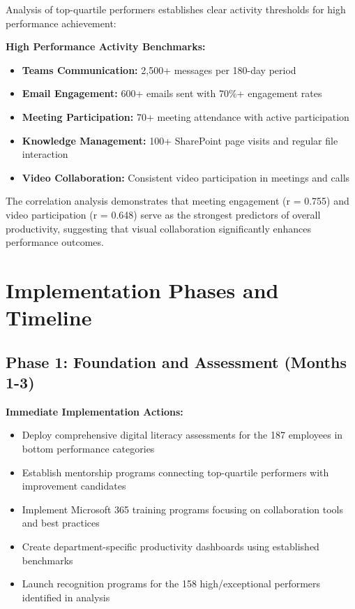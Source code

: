 \documentclass[12pt,a4paper]{article}
\begin{document}
Analysis of top-quartile performers establishes clear activity thresholds for high performance achievement:

\begin{featurebox}
\textbf{\faTarget \quad High Performance Activity Benchmarks:}
\begin{itemize}
    \item \textbf{Teams Communication:} 2,500+ messages per 180-day period
    \item \textbf{Email Engagement:} 600+ emails sent with 70\%+ engagement rates
    \item \textbf{Meeting Participation:} 70+ meeting attendance with active participation
    \item \textbf{Knowledge Management:} 100+ SharePoint page visits and regular file interaction
    \item \textbf{Video Collaboration:} Consistent video participation in meetings and calls
\end{itemize}
\end{featurebox}

The correlation analysis demonstrates that meeting engagement (r = 0.755) and video participation (r = 0.648) serve as the strongest predictors of overall productivity, suggesting that visual collaboration significantly enhances performance outcomes.

\section{Implementation Phases and Timeline}

\subsection{Phase 1: Foundation and Assessment (Months 1-3)}

\begin{featurebox}
\textbf{Immediate Implementation Actions:}
\begin{itemize}
    \item Deploy comprehensive digital literacy assessments for the 187 employees in bottom performance categories
    \item Establish mentorship programs connecting top-quartile performers with improvement candidates
    \item Implement Microsoft 365 training programs focusing on collaboration tools and best practices
    \item Create department-specific productivity dashboards using established benchmarks
    \item Launch recognition programs for the 158 high/exceptional performers identified in analysis
\end{itemize}
\end{featurebox}
\end{document}
